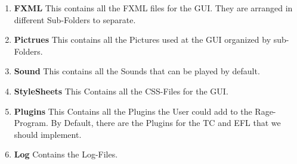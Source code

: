 		\begin{enumerate}[*]
			\item{
				\textbf{FXML} \newline
				This contains all the FXML files for the GUI.
				They are arranged in different Sub-Folders to separate.
				\newline
			}
			
			
			\item{
				\textbf{Pictrues} \newline
				This contains all the Pictures used at the GUI organized by sub-Folders.
			}
			\item{
				\textbf{Sound} \newline
				This contains all the Sounds that can be played by default.
			}
			\item{
				\textbf{StyleSheets} \newline
				This Contains all the CSS-Files for the GUI.
			}
			\item{
				\textbf{Plugins} \newline
				This Contains all the Plugins the User could add to the Rage-Program.
				By Default, there are the Plugins for the TC and EFL that we should implement.
			}
			\item{
				\textbf{Log} \newline
				Contains the Log-Files.
			}
		\end{enumerate}
